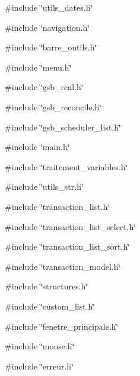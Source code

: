 {\ttfamily \#include \char`\"{}utils\_\-dates.h\char`\"{}}\par
{\ttfamily \#include \char`\"{}navigation.h\char`\"{}}\par
{\ttfamily \#include \char`\"{}barre\_\-outils.h\char`\"{}}\par
{\ttfamily \#include \char`\"{}menu.h\char`\"{}}\par
{\ttfamily \#include \char`\"{}gsb\_\-real.h\char`\"{}}\par
{\ttfamily \#include \char`\"{}gsb\_\-reconcile.h\char`\"{}}\par
{\ttfamily \#include \char`\"{}gsb\_\-scheduler\_\-list.h\char`\"{}}\par
{\ttfamily \#include \char`\"{}main.h\char`\"{}}\par
{\ttfamily \#include \char`\"{}traitement\_\-variables.h\char`\"{}}\par
{\ttfamily \#include \char`\"{}utils\_\-str.h\char`\"{}}\par
{\ttfamily \#include \char`\"{}transaction\_\-list.h\char`\"{}}\par
{\ttfamily \#include \char`\"{}transaction\_\-list\_\-select.h\char`\"{}}\par
{\ttfamily \#include \char`\"{}transaction\_\-list\_\-sort.h\char`\"{}}\par
{\ttfamily \#include \char`\"{}transaction\_\-model.h\char`\"{}}\par
{\ttfamily \#include \char`\"{}structures.h\char`\"{}}\par
{\ttfamily \#include \char`\"{}custom\_\-list.h\char`\"{}}\par
{\ttfamily \#include \char`\"{}fenetre\_\-principale.h\char`\"{}}\par
{\ttfamily \#include \char`\"{}mouse.h\char`\"{}}\par
{\ttfamily \#include \char`\"{}erreur.h\char`\"{}}\par

